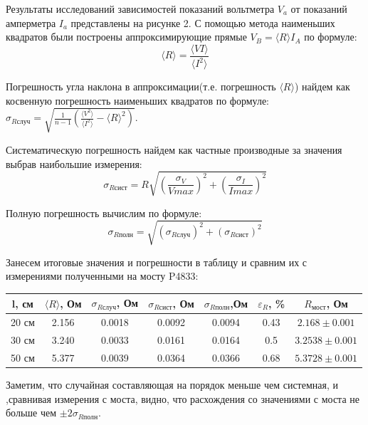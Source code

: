 \documentclass[a4paper]{article}
\begin{document}
Результаты исследований зависимостей показаний вольтметра $V_{a}$  от показаний амперметра $I_{a}$ представлены на рисунке 2.
С помощью метода наименьших квадратов были построены аппроксимирующие прямые $V_{B} = \langle R \rangle I_{A}$ по формуле: \[ \langle R \rangle = \frac{\langle VI \rangle}{\langle I^2 \rangle}\]\par
Погрешность угла наклона в аппроксимации(т.е. погрешность $\langle R \rangle$) найдем как косвенную погрешность наименьших квадратов по формуле: $\sigma_{R\text{случ}} = \sqrt{\frac{1}{n-1}(\frac{\langle V^2 \rangle}{\langle I^2 \rangle}-\langle R \rangle^2)}$.\par
Систематическую погрешность найдем как частные производные за значения выбрав наибольшие измерения: \[ \sigma_{R\text{сист}} = R \sqrt{\left(  \frac{\sigma_{V}}{Vmax}\right)^2 + \left(\frac{\sigma_{I}}{Imax}\right)^2}  \] \par
Полную погрешность вычислим по формуле: \[\sigma_{R\text{полн}} = \sqrt{\left( \sigma_{R\text{случ}}\right)^2 + \left( \sigma_{R\text{сист}}\right)^2} \] \par
Занесем итоговые значения и погрешности в таблицу и сравним их с измерениями полученными на мосту P4833:
\begin{center}
    \begin{tabular}{| c | c | c | c | c | c | c |}
     \hline
     l, см & $\langle R \rangle $, Ом & $\sigma_{R\text{случ}}$, Ом & $\sigma_{R\text{сист}}$, Ом & $\sigma_{R\text{полн}}$,Ом & $\varepsilon_{R}$, \% & $R_{\text{мост}}$, Ом \\
     \hline
     20 см & 2.156 & 0.0018 & 0.0092 & 0.0094 & 0.43 & $2.168 \pm 0.001$  \\ 
     \hline 
     30 см & 3.240 & 0.0033 & 0.0161 & 0.0164 & 0.5 &  $3.2538 \pm 0.001$  \\
     \hline
     50 см & 5.377 & 0.0039 & 0.0364 & 0.0366 & 0.68 & $5.3728 \pm 0.001$  \\
     \hline
    \end{tabular} 
\end{center}
Заметим, что случайная составляющая на порядок меньше чем системная, и ,сравнивая измерения с моста, видно, что расхождения со значениями с моста не больше чем $\pm 2\sigma_{R\text{полн}}$.
\end{document}
